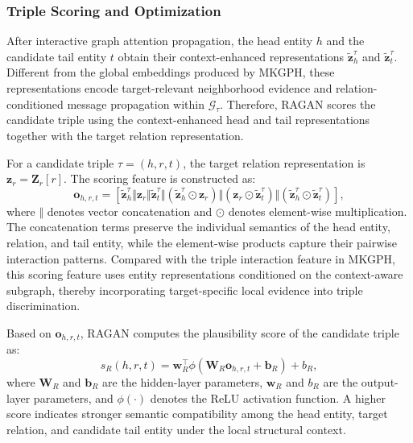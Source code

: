 \documentclass[pdflatex,sn-mathphys-num]{sn-jnl}
\begin{document}
\subsubsection{Triple Scoring and Optimization}

After interactive graph attention propagation, the head entity $h$ and the candidate tail entity $t$ obtain their context-enhanced representations $\widetilde{\mathbf{z}}_{h}^{\tau}$ and $\widetilde{\mathbf{z}}_{t}^{\tau}$. Different from the global embeddings produced by MKGPH, these representations encode target-relevant neighborhood evidence and relation-conditioned message propagation within $\mathcal{G}_{\tau}$. Therefore, RAGAN scores the candidate triple using the context-enhanced head and tail representations together with the target relation representation.

For a candidate triple $\tau=(h,r,t)$, the target relation representation is $\mathbf{z}_{r}=\mathbf{Z}_{r}[r]$. The scoring feature is constructed as:
\begin{equation}
\mathbf{o}_{h,r,t}
=
\left[
\widetilde{\mathbf{z}}_{h}^{\tau}
\Vert
\mathbf{z}_{r}
\Vert
\widetilde{\mathbf{z}}_{t}^{\tau}
\Vert
\left(
\widetilde{\mathbf{z}}_{h}^{\tau}
\odot
\mathbf{z}_{r}
\right)
\Vert
\left(
\mathbf{z}_{r}
\odot
\widetilde{\mathbf{z}}_{t}^{\tau}
\right)
\Vert
\left(
\widetilde{\mathbf{z}}_{h}^{\tau}
\odot
\widetilde{\mathbf{z}}_{t}^{\tau}
\right)
\right],
\end{equation}
where $\Vert$ denotes vector concatenation and $\odot$ denotes element-wise multiplication. The concatenation terms preserve the individual semantics of the head entity, relation, and tail entity, while the element-wise products capture their pairwise interaction patterns. Compared with the triple interaction feature in MKGPH, this scoring feature uses entity representations conditioned on the context-aware subgraph, thereby incorporating target-specific local evidence into triple discrimination.

Based on $\mathbf{o}_{h,r,t}$, RAGAN computes the plausibility score of the candidate triple as:
\begin{equation}
s_{R}(h,r,t)
=
\mathbf{w}_{R}^{\top}
\phi
\left(
\mathbf{W}_{R}
\mathbf{o}_{h,r,t}
+
\mathbf{b}_{R}
\right)
+
b_{R},
\end{equation}
where $\mathbf{W}_{R}$ and $\mathbf{b}_{R}$ are the hidden-layer parameters, $\mathbf{w}_{R}$ and $b_{R}$ are the output-layer parameters, and $\phi(\cdot)$ denotes the ReLU activation function. A higher score indicates stronger semantic compatibility among the head entity, target relation, and candidate tail entity under the local structural context.
\end{document}
